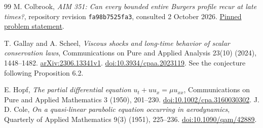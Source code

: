 \documentclass[11pt,a4paper]{article}
\numberwithin{equation}{section}
\theoremstyle{remark}\newtheorem{remark}[theorem]{Remark}
\begin{document}
\begin{thebibliography}{99}
 M. Colbrook, \emph{AIM 351: Can every bounded entire Burgers profile recur at late times?}, repository revision \texttt{fa98b7525fa3}, consulted 2 October 2026. \href{https://github.com/MColbrook/AIM/blob/fa98b7525fa3f78317536a8825f9cfa0ae1c369c/problems/351-burgers-entire-limits.md}{Pinned problem statement}.

 T. Gallay and A. Scheel, \emph{Viscous shocks and long-time behavior of scalar conservation laws}, Communications on Pure and Applied Analysis 23(10) (2024), 1448--1482. \href{https://arxiv.org/html/2306.13341v1}{arXiv:2306.13341v1}. \href{https://doi.org/10.3934/cpaa.2023119}{doi:10.3934/cpaa.2023119}. See the conjecture following Proposition 6.2.

 E. Hopf, \emph{The partial differential equation $u_t+uu_x=\mu u_{xx}$}, Communications on Pure and Applied Mathematics 3 (1950), 201--230. \href{https://doi.org/10.1002/cpa.3160030302}{doi:10.1002/cpa.3160030302}.
 J. D. Cole, \emph{On a quasi-linear parabolic equation occurring in aerodynamics}, Quarterly of Applied Mathematics 9(3) (1951), 225--236. \href{https://doi.org/10.1090/qam/42889}{doi:10.1090/qam/42889}.
\end{thebibliography}
\end{document}

